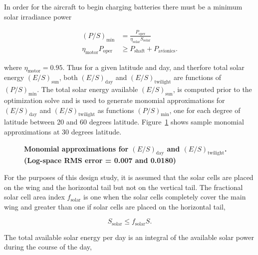 In order for the aircraft to begin charging batteries there must be a minimum solar irradiance power

\begin{align}
    (P/S)_{\text{min}} &= \frac{P_{\text{oper}}}{\eta_{\text{solar}} S_{\text{solar}}} \\
    \eta_{\text{motor}} P_{\text{oper}} &\geq P_{\text{shaft}} + P_{\text{avionics}}.
\end{align}

where $\eta_{\text{motor}} = 0.95$. Thus for a given latitude and day, and therfore total solar energy $(E/S)_{\text{sun}}$, both $(E/S)_{\text{day}}$ and $(E/S)_{\text{twilight}}$ are functions of $(P/S)_{\text{min}}$.  
The total solar energy available $(E/S)_{\text{sun}}$, is computed prior to the optimization solve and is used to generate monomial approximations for $(E/S)_{\text{day}}$ and $(E/S)_{\text{twilight}}$ as functions $(P/S)_{\text{min}}$, one for each degree of latitude between 20 and 60 degrees latitude. 
Figure~\ref{f:energyapprox} shows sample monomial approximations at 30 degrees latitude. 

\begin{figure}[H]
 \begin{subfigmatrix}{2}%
 \end{subfigmatrix}
 \caption{\textbf{Monomial approximations for $(E/S)_{\text{day}}$ and $(E/S)_{\text{twilight}}$. (Log-space RMS error = 0.007 and 0.0180)}}
 \label{f:energyapprox}
\end{figure}

For the purposes of this design study, it is assumed that the solar cells are placed on the wing and the horizontal tail but not on the vertical tail. 
The fractional solar cell area index $f_{\text{solar}}$ is one when the solar cells completely cover the main wing and greater than one if solar cells are placed on the horizontal tail,

\begin{equation}
    \label{e:solarssolar}
    S_{\text{solar}} \leq f_{\text{solar}}S.
\end{equation}

The total available solar energy per day is an integral of the available solar power during the course of the day,

